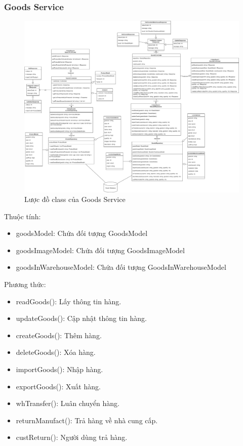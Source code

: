 \subsubsection{Goods Service}
\begin{figure}[!htp]
	\centering
	\includegraphics[width=17cm]{img/Architecture/service/GoodsService.png}
	\newline
	\caption{Lược đồ class của Goods Service}
\end{figure}
Thuộc tính:
\begin{itemize}
	\item goodsModel: Chứa đối tượng GoodsModel
	\item goodsImageModel: Chứa đối tượng GoodsImageModel
	\item goodsInWarehouseModel: Chứa đối tượng GoodsInWarehouseModel
\end{itemize}
Phương thức:
\begin{itemize}
	\item readGoods(): Lấy thông tin hàng.
	\item updateGoods(): Cập nhật thông tin hàng.
	\item createGoods(): Thêm hàng.
	\item deleteGoods(): Xóa hàng.
	\item importGoods(): Nhập hàng.
	\item exportGoods(): Xuất hàng.
	\item whTransfer(): Luân chuyển hàng.
	\item returnManufact(): Trả hàng về nhà cung cấp.
	\item custReturn(): Người dùng trả hàng.
\end{itemize}

